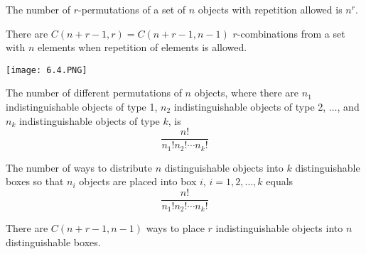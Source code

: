 \documentclass[../discrete.tex]{subfiles}
\begin{document}
\begin{theorem}
    The number of $r$-permutations of a set of $n$ objects with repetition allowed is $n^r$.
\end{theorem}

\begin{theorem}
    There are $C(n+r-1,r)=C(n+r-1,n-1)$ $r$-combinations from a set with $n$ elements when repetition of elements is allowed.
\end{theorem}

\begin{center}
    \texttt{[image: 6.4.PNG]}
\end{center}
\begin{theorem}
    The number of different permutations of $n$ objects, where there are $n_1$ indistinguishable objects of type 1, $n_2$ indistinguishable objects of 
    type 2, $\dots$, and $n_k$ indistinguishable objects of type $k$, is 
    \[\frac{n!}{n_1!n_2!\cdots n_k!}\]
\end{theorem}
\begin{theorem}
    The number of ways to distribute $n$ distinguishable objects into $k$ distinguishable boxes so that $n_i$ objects 
    are placed into box $i$, $i=1,2,\dots,k$ equals 
    \[\frac{n!}{n_1!n_2!\cdots n_k!}\]
\end{theorem}

There are $C(n+r-1, n-1)$ ways to place $r$ indistinguishable objects into $n$ distinguishable boxes.
\end{document}

